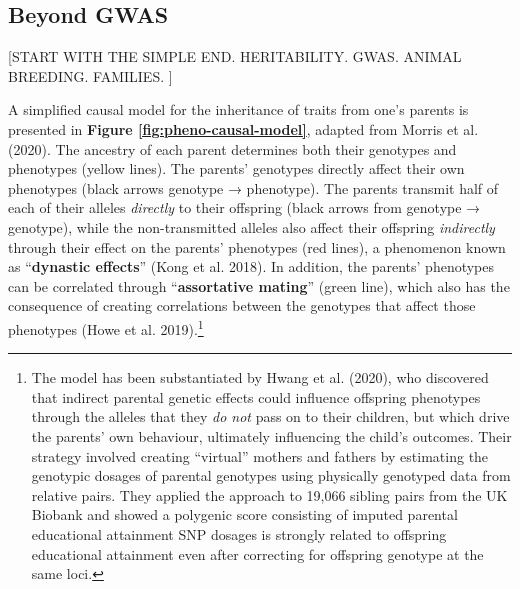 \documentclass[
]{book}
\begin{document}
\hypertarget{beyond-gwas}{%
\subsection{Beyond GWAS}\label{beyond-gwas}}

{[}START WITH THE SIMPLE END. HERITABILITY. GWAS. ANIMAL BREEDING. FAMILIES. {]}

A simplified causal model for the inheritance of traits from one's parents is presented in \textbf{Figure \ref{fig:pheno-causal-model}}, adapted from Morris et al. (2020). The ancestry of each parent determines both their genotypes and phenotypes (yellow lines). The parents' genotypes directly affect their own phenotypes (black arrows genotype → phenotype). The parents transmit half of each of their alleles \emph{directly} to their offspring (black arrows from genotype → genotype), while the non-transmitted alleles also affect their offspring \emph{indirectly} through their effect on the parents' phenotypes (red lines), a phenomenon known as ``\textbf{dynastic effects}'' (Kong et al. 2018). In addition, the parents' phenotypes can be correlated through ``\textbf{assortative mating}'' (green line), which also has the consequence of creating correlations between the genotypes that affect those phenotypes (Howe et al. 2019).\footnote{The model has been substantiated by Hwang et al. (2020), who discovered that indirect parental genetic effects could influence offspring phenotypes through the alleles that they \emph{do not} pass on to their children, but which drive the parents' own behaviour, ultimately influencing the child's outcomes. Their strategy involved creating ``virtual'' mothers and fathers by estimating the genotypic dosages of parental genotypes using physically genotyped data from relative pairs. They applied the approach to 19,066 sibling pairs from the UK Biobank and showed a polygenic score consisting of imputed parental educational attainment SNP dosages is strongly related to offspring educational attainment even after correcting for offspring genotype at the same loci.}
\end{document}
